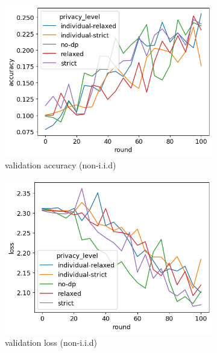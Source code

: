\begin{figure}[tb]
	\centering
	\begin{subfigure}{0.45\textwidth}
		\centering
		\includegraphics[width=\textwidth]{Bilder/cifar10-accuracy.png}
		\caption{validation accuracy (non-i.i.d)}
	\end{subfigure}
	\begin{subfigure}{0.45\textwidth}
		\centering
		\includegraphics[width=\textwidth]{Bilder/cifar10-loss.png}
		\caption{validation loss (non-i.i.d)}
	\end{subfigure}
	\begin{subfigure}{0.45\textwidth}
		\centering

\end{subfigure}
\end{figure}
